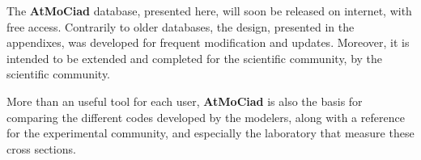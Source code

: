 \documentclass[a4paper,12pt]{book}
\begin{document}
The \textbf{AtMoCiad} database, presented here, will soon be released on internet, with free access. Contrarily to older databases, the design, presented in the appendixes, was developed for frequent modification and updates. Moreover, it is intended to be extended and completed for the scientific community, by the scientific community.

More than an useful tool for each user, \textbf{AtMoCiad} is also the basis for comparing the different codes developed by the modelers, along with a reference for the experimental community, and especially the laboratory that measure these cross sections.  



\appendix
\label{appendixes}

%
%
\printnomenclature
{}




\end{document}
